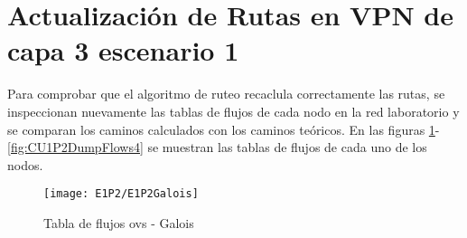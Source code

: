 %
%
%
%
%
%


\section{Actualización de Rutas en VPN de capa 3 escenario 1}
\label{appendix6.3}

Para comprobar que el algoritmo de ruteo recaclula correctamente las rutas, se inspeccionan nuevamente las tablas de flujos de cada nodo en la red laboratorio y se comparan los caminos calculados con los caminos te\'oricos. En las figuras \ref{fig:CU1P2DumpFlows1}-\ref{fig:CU1P2DumpFlows4} se muestran las tablas de flujos de cada uno de los nodos.\\

\newpage
\begin{figure}[ht!] 
\centering    
\texttt{[image: E1P2/E1P2Galois]}
\caption[Tabla de flujos ovs - Galois]{Tabla de flujos ovs - Galois}
\label{fig:CU1P2DumpFlows1}
\end{figure}

